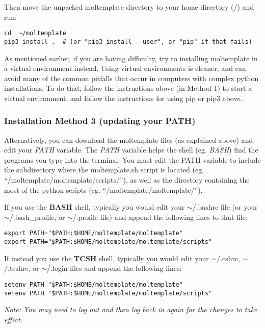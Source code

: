 \documentclass[11pt]{article}
\begin{document}
Then move the unpacked moltemplate directory
to your home directory (\texttildelow/) and run:
\begin{verbatim}
cd  ~/moltemplate
pip3 install .  # (or "pip3 install --user", or "pip" if that fails)
\end{verbatim}

As mentioned earlier, if you are having difficulty, try to installing
moltemplate in a virtual environment instead.  Using virtual environments
is cleaner, and can avoid many of the common pitfalls that occur in computers
with complex python installations.  To do that, follow the
instructions above (in Method 1) to start a virtual environment,
and follow the instructions for using pip or pip3 above.



\subsubsection*{Installation Method 3 (updating your PATH)}

Alternatively, you can download the moltemplate files
(as explained above) and edit your \textit{PATH} variable.
The \textit{PATH} variable helps the shell
(eg. \textit{BASH}) find the programs
you type into the terminal.  You must edit the PATH variable to include
the subdirectory where the moltemplate.sh script is located 
(eg. ``\texttildelow/moltemplate/moltemplate/scripts/''), as well as
the directory containing the most of the python scripts
(eg. ``\texttildelow/moltemplate/moltemplate/'').

If you use the \textbf{BASH} shell, typically you would edit your 
\mbox{$\sim$/.bashrc} file
(or your \mbox{$\sim$/.bash\_profile},
 or \mbox{$\sim$/.profile} file)
and append the following lines to that file:
\begin{verbatim}
export PATH="$PATH:$HOME/moltemplate/moltemplate"
export PATH="$PATH:$HOME/moltemplate/moltemplate/scripts"
\end{verbatim}
If instead you use the \textbf{TCSH} shell, typically you would edit your 
\mbox{$\sim$/.cshrc}, 
\mbox{$\sim$/.tcshrc}, or
\mbox{$\sim$/.login} files
and append the following lines:
\begin{verbatim}
setenv PATH "$PATH:$HOME/moltemplate/moltemplate"
setenv PATH "$PATH:$HOME/moltemplate/moltemplate/scripts"
\end{verbatim}



\textit{Note: You may need to log out and then 
log back in again for the changes to take effect.}
\end{document}
